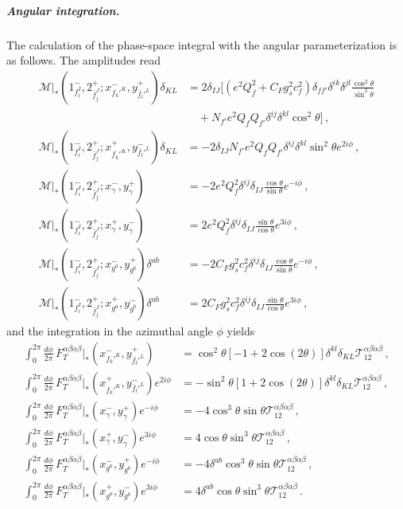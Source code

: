 \subparagraph{Angular integration.}
The calculation of the phase-space integral with the angular parameterization is as follows.
The amplitudes read
\begin{align}
    \mathcal M|_{*} (1_{f_i^I}^{-},2_{\bar f_j^J}^{+}; x_{f_k'^K}^{-},y_{\bar f_l'^L}^{+})\delta_{KL} &= 
    2\delta_{IJ}\bigg[(e^2Q_f^2+C_Fg_s^2c_f^2)\delta_{ff'}\delta^{ik}\delta^{jl}\frac{\cos^2\theta}{\sin^2\theta}\nonumber\\ &\quad + N_{f'} e^2Q_f Q_{f'} \delta^{ij}\delta^{kl}\cos^2\theta \bigg]\,, \\
    \mathcal M|_{*} (1_{f_i^I}^{-},2_{\bar f_j^J}^{+}; x_{f_k'^K}^{+},y_{\bar f_l'^L}^{-})\delta_{KL} &= -2\delta_{IJ} N_{f'} e^2Q_f Q_{f'}\delta^{ij}\delta^{kl} \sin^2\theta e^{2i\phi}\,, \\
    \mathcal M|_*(1^-_{f_i^I},2^+_{\bar f_j^J};x^-_\gamma,y^+_\gamma) &= -2e^2Q_f^2\delta^{ij}\delta_{IJ}\frac{\cos\theta}{\sin\theta}e^{-i\phi}\,, \\
    \mathcal M|_*(1^-_{f_i^I},2^+_{\bar f_j^J};x^+_\gamma,y^-_\gamma) &= 2e^2Q_f^2\delta^{ij}\delta_{IJ}\frac{\sin\theta}{\cos\theta}e^{3i\phi}\,, \\
    \mathcal M|_*(1^-_{f_i^I},2^+_{\bar f_j^J};x^-_{g^a},y^+_{g^b})\delta^{ab} &= -2C_Fg_s^2c_f^2\delta^{ij}\delta_{IJ}\frac{\cos\theta}{\sin\theta}e^{-i\phi}\,, \\
    \mathcal M|_*(1^-_{f_i^I},2^+_{\bar f_j^J};x^+_{g^a},y^-_{g^b})\delta^{ab} &= 2C_Fg_s^2c_f^2\delta^{ij}\delta_{IJ}\frac{\sin\theta}{\cos\theta}e^{3i\phi}\,,
\end{align}
and the integration in the azimuthal angle $\phi$ yields
\begin{align}
    \int_0^{2\pi}\frac{d\phi}{2\pi}\,F_T^{\alpha\beta\dot\alpha\dot\beta}|_{*}(x_{f_k'^K}^{-},y_{\bar f_l'^L}^{+}) &= \cos^2\theta[-1+2\cos(2\theta)]\delta^{kl}\delta_{KL}\mathcal T^{\alpha\beta\dot\alpha\dot\beta}_{12}\,,\\
    \int_0^{2\pi}\frac{d\phi}{2\pi}\,F_T^{\alpha\beta\dot\alpha\dot\beta}|_{*}(x_{f_k'^K}^{+},y_{\bar f_l'^L}^{-})e^{2i\phi} &= -\sin^2\theta [1+2\cos(2\theta)]\delta^{kl}\delta_{KL}\mathcal T^{\alpha\beta\dot\alpha\dot\beta}_{12}\,, \\
    \int_0^{2\pi}\frac{d\phi}{2\pi}\,F_T^{\alpha\beta\dot\alpha\dot\beta}|_{*}(x_{\gamma}^{-},y_{\gamma}^{+})e^{-i\phi} &= -4\cos^3\theta\sin\theta \mathcal T^{\alpha\beta\dot\alpha\dot\beta}_{12}\,, \\
    \int_0^{2\pi}\frac{d\phi}{2\pi}\,F_T^{\alpha\beta\dot\alpha\dot\beta}|_{*}(x_{\gamma}^{+},y_{\gamma}^{-})e^{3i\phi} &= 4\cos\theta\sin^3\theta \mathcal T^{\alpha\beta\dot\alpha\dot\beta}_{12}\,,\\
    \int_0^{2\pi}\frac{d\phi}{2\pi}\,F_T^{\alpha\beta\dot\alpha\dot\beta}|_{*}(x_{g^a}^{-},y_{g^b}^{+})e^{-i\phi} &= -4\delta^{ab}\cos^3\theta\sin\theta \mathcal T^{\alpha\beta\dot\alpha\dot\beta}_{12}\,, \\
    \int_0^{2\pi}\frac{d\phi}{2\pi}\,F_T^{\alpha\beta\dot\alpha\dot\beta}|_{*}(x_{g^a}^{+},y_{g^b}^{-})e^{3i\phi} &= 4\delta^{ab}\cos\theta\sin^3\theta \mathcal T^{\alpha\beta\dot\alpha\dot\beta}_{12}\,.
\end{align}
